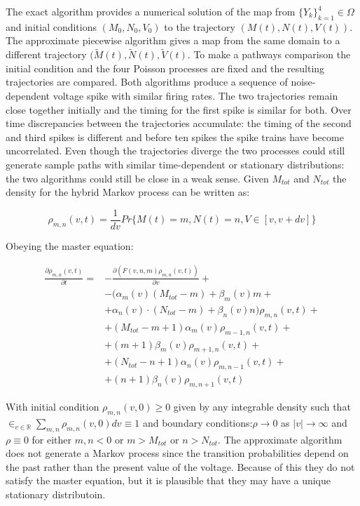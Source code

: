 The exact algorithm provides a numerical solution of the map from $\{Y_k\}_{k=1}^4\in\Omega$ and initial conditions $(M_0, N_0, V_0)$ to the trajectory $(M(t), N(t), V(t))$.
The approximate piecewise algorithm gives a map from the same domain to a different trajectory $(\tilde{M}(t), \tilde{N}(t), \tilde{V}(t)$.
To make a pathways comparison the initial condition and the four Poisson processes are fixed and the resulting trajectories are compared.
Both algorithms produce a sequence of noise-dependent voltage spike with similar firing rates.
The two trajectories remain close together initially and the timing for the first spike is similar for both.
Over time discrepancies between the trajectories accumulate: the timing of the second and third spikes is different and before ten spikes the spike trains have become uncorrelated.
Even though the trajectories diverge the two processes could still generate sample paths with similar time-dependent or stationary distributions: the two algorithms could still be close in a weak sense.
Given $M_{tot}$ and $N_{tot}$ the density for the hybrid Markov process can be written as:

$$\rho_{m,n}(v,t) = \frac{1}{dv}Pr\{M(t) = m, N(t) = n, V\in[v, v+dv]\}$$

Obeying the master equation:

\begin{align*}
	\frac{\partial\rho_{m, n}(v, t)}{\partial t} =& - \frac{\partial(F(v, n, m)\rho_{m, n}(v, t))}{\partial v} +\\
																								&-(\alpha_m(v)(M_{tot}-m)+\beta_m(v)m+\\
																								&+\alpha_n(v)\cdot(N_{tot}-m)+\beta_n(v)n)\rho_{m, n}(v, t)+\\
																								&+(M_{tot}-m+1)\alpha_m(v)\rho_{m-1, n}(v, t)+\\
																								&+(m+1)\beta_m(v)\rho_{m+1, n}(v, t)+\\
																								&+(N_{tot}-n+1)\alpha_n(v)\rho_{m, n-1}(v,t)+\\
																								&+(n+1)\beta_n(v)\rho_{m, n+1}(v, t)
\end{align*}

With initial condition $\rho_{m,n}(v,0)\ge 0$ given by any integrable density such that $\in_{v\in\mathbb{R}}\sum\limits_{m,n}\rho_{m, n}(v, 0)dv \equiv 1$ and boundary conditions:$\rho\rightarrow 0$ as $|v|\rightarrow\infty$ and $\rho\equiv 0$ for either $m, n<0$ or $m> M_{tot}$ or $n>N_{tot}$.
The approximate algorithm does not generate a Markov process since the transition probabilities depend on the past rather than the present value of the voltage.
Because of this they do not satisfy the master equation, but it is plausible that they may have a unique stationary distributoin.

